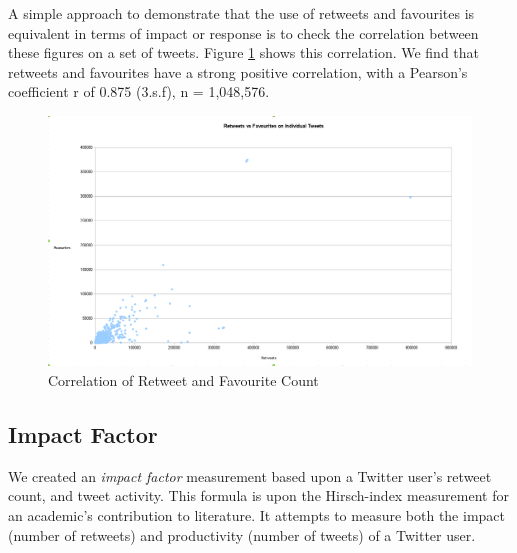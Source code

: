 
A simple approach to demonstrate that the use of retweets and favourites is equivalent in terms of impact or response is to check the correlation between these figures on a set of tweets. Figure \ref{fig:correlation_retweet_fav} shows this correlation. We find that retweets and favourites have a strong positive correlation, with a Pearson's coefficient r of 0.875 (3.s.f), n = 1,048,576. 

\begin{figure}[h!]
\begin{center}
 \centering
\includegraphics[width=500px]{Images/retweets_vs_favourites.pdf}
\caption{Correlation of Retweet and Favourite Count}
\label{fig:correlation_retweet_fav}
\end{center}
\end{figure}


\subsection{Impact Factor}

We created an \textit{impact factor} measurement based upon a Twitter user's retweet count, and tweet activity. This formula is upon the Hirsch-index \cite{hirsch2005index} measurement for an academic's contribution to literature. It attempts to measure both the impact (number of retweets) and productivity (number of tweets) of a Twitter user. 


